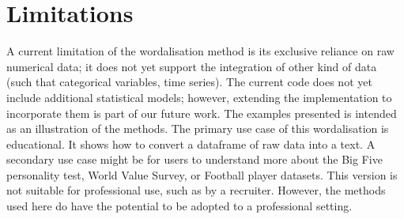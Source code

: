 \documentclass{article}
\begin{document}
\section*{Limitations}
A current limitation of the wordalisation method is its exclusive reliance on raw numerical data; it does not yet support the integration of other kind of data (such that categorical variables, time series). The current code does not yet include additional statistical models; however, extending the implementation to incorporate them is part of our future work.
The examples presented is intended as an illustration of the methods. The primary use case of this wordalisation is educational. It shows how to convert a dataframe of raw data into a text. A secondary use case might be for users to understand more about the Big Five personality test, World Value Survey, or Football player datasets. This version is not suitable for professional use, such as by a recruiter. However, the methods used here do have the potential to be adopted to a professional setting. 








\newpage

\end{document}
